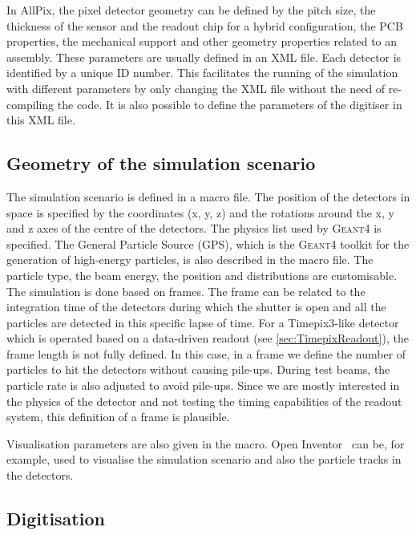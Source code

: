 In AllPix, the pixel detector geometry can be defined by the pitch
size, the thickness of the sensor and the readout chip for a hybrid
configuration, the PCB properties, the mechanical support and other
geometry properties related to an assembly. These parameters are
usually defined in an XML file. Each detector is identified by a
unique ID number. This facilitates the running of the simulation with
different parameters by only changing the XML file without the need of
re-compiling the code. It is also possible to define the parameters of
the digitiser in this XML file.
\subsection{Geometry of the simulation scenario}

The simulation scenario is defined in a macro file. The position of
the detectors in space is specified by the coordinates (x, y, z) and
the rotations around the x, y and z axes of the centre of the
detectors. The physics list used by \textsc{Geant4} is specified. The
General Particle Source (GPS), which is the \textsc{Geant4} toolkit
for the generation of high-energy particles, is also described in the
macro file. The particle type, the beam energy, the position and
distributions are customisable. The simulation is done based on
frames. The frame can be related to the integration time of the
detectors during which the shutter is open and all the particles are
detected in this specific lapse of time. For a Timepix3-like detector
which is operated based on a data-driven readout (see
\cref{sec:TimepixReadout}), the frame length is not fully defined. In
this case, in a frame we define the number of particles to hit the
detectors without causing pile-ups. During test beams, the particle
rate is also adjusted to avoid pile-ups. Since we are mostly
interested in the physics of the detector and not testing the timing
capabilities of the readout system, this definition of a frame is
plausible.

Visualisation parameters are also given in the macro. Open
Inventor~\cite{OpenInventor} can be, for example, used to visualise
the simulation scenario and also the particle tracks in the detectors.

\subsection{Digitisation}
\label{sec:allpix_digitisation}

